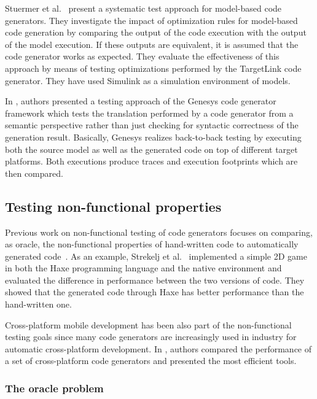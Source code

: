 Stuermer et al.~\cite{stuermer2007systematic} present a systematic test approach for model-based code generators. They investigate the impact of optimization rules for model-based code generation by comparing the output of the code execution with the output of the model execution. 
If these outputs are equivalent, it is assumed that the code generator works as expected. 
They evaluate the effectiveness of this approach by means of testing optimizations performed by the TargetLink code generator. 
They have used Simulink as a simulation environment of models. 




In \cite{jorges2014back}, authors presented a testing approach of the Genesys code generator framework which tests the translation performed by a code generator from a semantic perspective rather than just checking for syntactic correctness of the generation result. Basically,
Genesys realizes back-to-back testing by executing both the source model as well as the generated code on top of different target platforms. Both executions produce traces and execution footprints which are then compared.



\subsection{Testing non-functional properties}
Previous work on non-functional testing of code generators focuses on comparing, as oracle, the non-functional properties of hand-written code to automatically generated code~\cite{stepasyuk2015evaluating,richard2013efficient}. As an example, Strekelj et al.~\cite{vstrekelj2015performance} implemented a simple 2D game in both the Haxe programming language and the native environment and evaluated the difference in performance between the two versions of code. They showed that the generated code through Haxe has better performance than the hand-written one. 

Cross-platform mobile development has been also part of the non-functional testing goals since many code generators are increasingly used in industry for automatic cross-platform development. In \cite{pazirandeh2015evaluation,hartmann2011cross}, authors compared the performance of a set of cross-platform code generators and presented the most efficient tools.
\subsubsection{The oracle problem}


